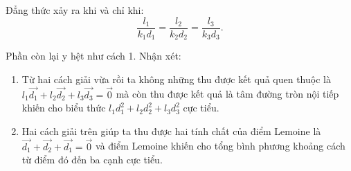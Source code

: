 \begin{enumerate}[label=(\alph*)]
Đẳng thức xảy ra khi và chỉ khi: 
\begin{equation}
\dfrac{l_1}{k_1d_1}=\dfrac{l_2}{k_2d_2}=\dfrac{l_3}{k_3d_3}.
\end{equation}

Phần còn lại y hệt như cách 1. Nhận xét:

\begin{enumerate}[label=(\roman*)]
    \item Từ hai cách giải vừa rồi ta không những thu được kết quả quen thuộc là $l_1\vec{d_1}+l_2\vec{d_2}+l_3\vec{d_3}=\vec{0}$ mà còn thu được kết quả là tâm đường tròn nội tiếp khiến cho biểu thức $l_1d_1^2+l_2d_2^2+l_3d_3^2$ cực tiểu.
    \item Hai cách giải trên giúp ta thu được hai tính chất của điểm Lemoine là $\vec{d_1}+\vec{d_2}+\vec{d_1}=\vec{0}$ và điểm Lemoine khiến cho tổng bình phương khoảng cách từ điểm đó đến ba cạnh cực tiểu.
\end{enumerate}
\end{enumerate}
